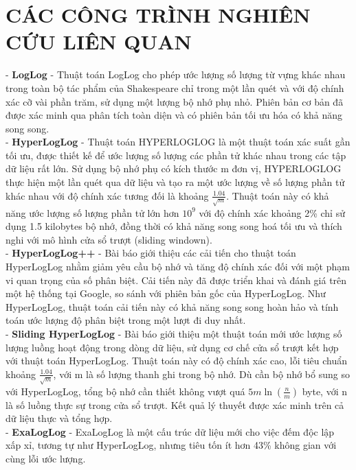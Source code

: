 \documentclass[letterpaper,13pt]{article}
\theoremstyle{mytheor}
\begin{document}
\section{CÁC CÔNG TRÌNH NGHIÊN CỨU LIÊN QUAN}
- \textbf{LogLog} - \cite{durand2003loglog} Thuật toán LogLog cho phép ước lượng số lượng từ vựng khác nhau trong toàn bộ tác phẩm của Shakespeare chỉ trong một lần quét và với độ chính xác 
cỡ vài phần trăm, sử dụng một lượng bộ nhớ phụ nhỏ. Phiên bản cơ bản đã được xác minh qua phân tích toàn diện và có phiên bản tối ưu hóa có khả năng song song.\\
- \textbf{HyperLogLog} - \cite{flajolet2007hyperloglog} Thuật toán HYPERLOGLOG là một thuật toán xác suất gần tối ưu, được thiết kế để ước lượng số lượng các phần tử khác nhau trong các tập dữ liệu rất lớn. 
Sử dụng bộ nhớ phụ có kích thước m đơn vị, HYPERLOGLOG thực hiện một lần quét qua dữ liệu và tạo ra một ước lượng về số lượng phần tử khác nhau với độ chính xác tương đối là khoảng $\frac{1.04}{\sqrt{m}}$. 
Thuật toán này có khả năng ước lượng số lượng phần tử lớn hơn $10^9$ với độ chính xác khoảng 2\% chỉ sử dụng 1.5 kilobytes bộ nhớ, đồng thời có khả năng song song hoá tối ưu 
và thích nghi với mô hình cửa sổ trượt (sliding windown).\\
- \textbf{HyperLogLog++} - \cite{heule2013hyperloglog} Bài báo giới thiệu các cải tiến cho thuật toán HyperLogLog nhằm giảm yêu cầu bộ nhớ và tăng độ 
chính xác đối với một phạm vi quan trọng của số phân biệt. Cải tiến này đã được triển khai và đánh giá trên một hệ thống tại Google, so sánh với 
phiên bản gốc của HyperLogLog. Như HyperLogLog, thuật toán cải tiến này có khả năng song song hoàn hảo và tính toán ước lượng độ phân biệt trong 
một lượt đi duy nhất. \\
- \textbf{Sliding HyperLogLog} - \cite{chabchoub2010sliding} Bài báo giới thiệu một thuật toán mới ước lượng số lượng luồng hoạt động trong dòng dữ liệu, sử dụng cơ chế cửa sổ trượt kết hợp với 
thuật toán HyperLogLog. Thuật toán này có độ chính xác cao, lỗi tiêu chuẩn khoảng $\frac{1.04}{\sqrt{m}}$, với m là số lượng thanh ghi trong bộ nhớ. Dù cần bộ nhớ bổ sung 
so với HyperLogLog, tổng bộ nhớ cần thiết không vượt quá $5m\ln(\frac{n}{m})$ byte, với n là số luồng thực sự trong cửa sổ trượt. Kết quả lý thuyết được xác minh trên cả dữ liệu thực 
và tổng hợp.\\
- \textbf{ExaLogLog} - \cite{ertl2024exaloglog} ExaLogLog là một cấu trúc dữ liệu mới cho việc đếm độc lập xấp xỉ, tương tự như HyperLogLog, nhưng tiêu tốn ít hơn 43\% không gian với cùng lỗi ước lượng.\\
\end{document}
